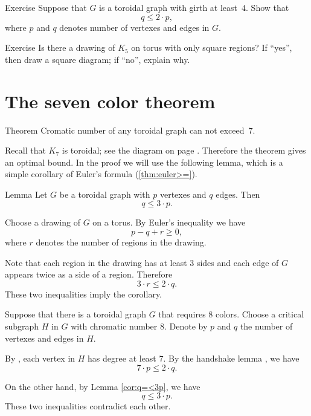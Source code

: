 \begin{thm}{Exercise}
Suppose that $G$ is a toroidal graph with girth at least~$4$.
Show that 
\[q\le 2\cdot p,\]
where $p$ and $q$ denotes number of vertexes and edges in $G$.
\end{thm}

\begin{thm}{Exercise}
Is there a drawing of $K_5$ on torus with only square regions?
If ``yes'', then draw a square diagram; if ``no'', explain why.
\end{thm}

\section*{The seven color theorem}

\begin{thm}{Theorem}\label{thm:7-colors}
Cromatic number of any toroidal graph can not exceed~$7$.
\end{thm}

Recall that $K_7$ is toroidal; see the diagram on page \pageref{K5-toroidal}.
Therefore the theorem gives an optimal bound.
In the proof we will use the following lemma, which is a simple corollary of Euler's formula (\ref{thm:euler>=}).

\begin{thm}{Lemma}\label{cor:q=<3p}
Let $G$ be a toroidal graph with $p$ vertexes and $q$ edges.
Then 
\[q\le 3\cdot p.\]

\end{thm}

Choose a drawing of $G$ on a torus.
By Euler's inequality we have
\[p-q+r\ge 0,\]
where $r$ denotes the number of regions in the drawing.

Note that each region in the drawing has at least $3$ sides
and each edge of $G$ appears twice as a side of a region.
Therefore 
\[3\cdot r\le 2\cdot q.\]
These two inequalities imply the corollary.
\qeds


Suppose that there is a toroidal graph $G$ that requires $8$ colors.
Choose a critical subgraph $H$ in $G$ with chromatic number 8.
Denote by $p$ and $q$ the number of vertexes and edges in $H$.

By \cite[Theorem 2.1.3]{hartsfield-ringel}, each vertex in $H$ has degree at least $7$.
By the handshake lemma \cite[Theorem 1.1.1]{hartsfield-ringel}, we have 
\[7\cdot p\le 2\cdot q.\]

On the other hand, by Lemma \ref{cor:q=<3p}, we have
\[q\le 3\cdot p.\]
These two inequalities contradict each other.
 \qeds

